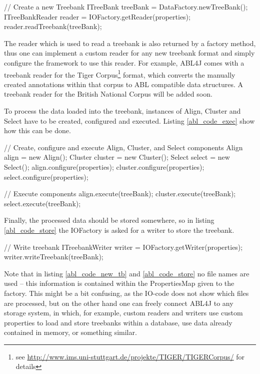 \documentclass[12pt,a4paper]{article}
\newcommand{\link}[1]{\href{#1}{#1}}
\begin{document}
\begin{java} [caption={Creating a new Treebank},
label={abl_code_new_tb}] 
		// Create a new Treebank
		ITreeBank treeBank = DataFactory.newTreeBank();
		ITreeBankReader reader = IOFactory.getReader(properties);
		reader.readTreebank(treeBank);
\end{java}

The reader which is used to read a treebank is also returned by a factory method, thus one
can implement a custom reader for any new treebank format and simply configure
the framework to use this reader. For example, ABL4J comes with a treebank reader
for the Tiger Corpus\footnote{see
\link{http://www.ims.uni-stuttgart.de/projekte/TIGER/TIGERCorpus/} for details}
format, which converts the manually created annotations within that corpus to ABL
compatible data structures. A treebank reader for the British National Corpus
will be added soon.

To process the data loaded into the treebank, instances of Align, Cluster and
Select have to be created, configured and executed. Listing \ref{abl_code_exec}
show how this can be done.

\begin{java} [caption={Running ABL Components}, label={abl_code_exec}] 
		// Create, configure and execute Align, Cluster, and Select components
		Align align = new Align();
		Cluster cluster = new Cluster();
		Select select = new Select();
		align.configure(properties);
		cluster.configure(properties);
		select.configure(properties);
		
		// Execute components
		align.execute(treeBank);
		cluster.execute(treeBank);
		select.execute(treeBank);
\end{java}

Finally, the processed data should be stored somewhere, so in listing
\ref{abl_code_store} the IOFactory is asked for a writer to store the treebank.

\begin{java} [caption={Storing the new Treebank}, label={abl_code_store}] 
		// Write treebank
		ITreebankWriter writer = IOFactory.getWriter(properties);
		writer.writeTreebank(treeBank);
\end{java}

Note that in listing \ref{abl_code_new_tb} and \ref{abl_code_store} no file
names are used -- this information is contained within the PropertiesMap given
to the factory. This might be a bit confusing, as the IO-code does not
show which files are processed, but on the other hand one can freely connect
ABL4J to any storage system, in which, for example, custom readers and writers
use custom properties to load and store treebanks within a database, use data
already contained in memory, or something similar.
\end{document}
